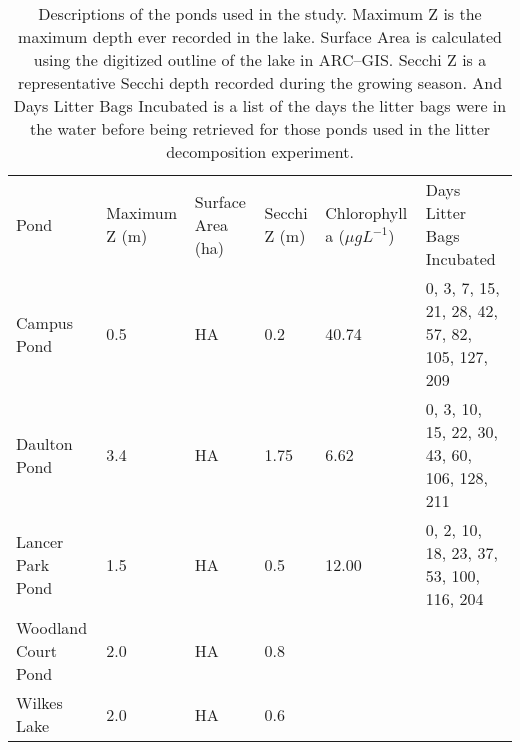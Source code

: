 \begin{table}  
\label{tab:ponds}
\begin{tabular}{l l l l l l}
Pond & Maximum Z (m) & Surface Area (ha) & Secchi Z (m) & Chlorophyll a ($\mu g L^{-1}$) & Days Litter Bags Incubated \\
Campus Pond & 0.5 & HA & 0.2 & 40.74 & 0, 3, 7, 15, 21, 28, 42, 57, 82, 105, 127, 209\\
Daulton Pond & 3.4 & HA & 1.75 & 6.62 & 0, 3, 10, 15, 22, 30, 43, 60, 106, 128, 211\\
Lancer Park Pond & 1.5 & HA & 0.5 & 12.00 & 0, 2, 10, 18, 23, 37, 53, 100, 116, 204\\
Woodland Court Pond & 2.0 & HA & 0.8 & & \\
Wilkes Lake & 2.0 & HA & 0.6 & & \\
\end{tabular}
\caption{Descriptions of the ponds used in the study. Maximum Z is the maximum depth ever recorded in the lake. Surface Area is calculated using the digitized outline of the lake in ARC--GIS. Secchi Z is a representative Secchi depth recorded during the growing season. And Days Litter Bags Incubated is a list of the days the litter bags were in the water before being retrieved for those ponds used in the litter decomposition experiment.}
\end{table}